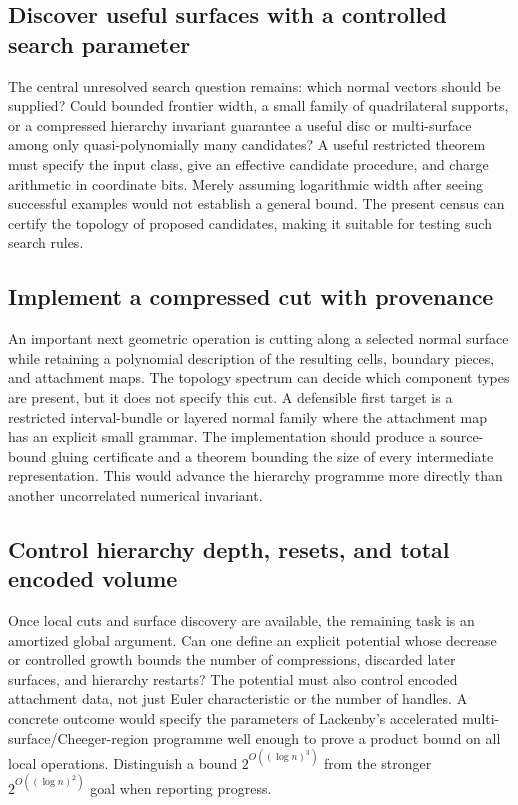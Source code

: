 \subsection{Discover useful surfaces with a controlled search parameter}

The central unresolved search question remains: which normal vectors should
be supplied? Could bounded frontier width, a small family of quadrilateral
supports, or a compressed hierarchy invariant guarantee a useful disc or
multi-surface among only quasi-polynomially many candidates? A useful
restricted theorem must specify the input class, give an effective
candidate procedure, and charge arithmetic in coordinate bits. Merely
assuming logarithmic width after seeing successful examples would not
establish a general bound. The present census can certify the topology
of proposed candidates, making it suitable for testing such search rules.

\subsection{Implement a compressed cut with provenance}

An important next geometric operation is cutting along a selected normal
surface while retaining a polynomial description of the resulting cells,
boundary pieces, and attachment maps. The topology spectrum can decide
which component types are present, but it does not specify this cut.
A defensible first target is a restricted interval-bundle or layered
normal family where the attachment map has an explicit small grammar.
The implementation should produce a source-bound gluing certificate and
a theorem bounding the size of every intermediate representation. This
would advance the hierarchy programme more directly than another
uncorrelated numerical invariant.

\subsection{Control hierarchy depth, resets, and total encoded volume}

Once local cuts and surface discovery are available, the remaining task
is an amortized global argument. Can one define an explicit potential
whose decrease or controlled growth bounds the number of compressions,
discarded later surfaces, and hierarchy restarts? The potential must also
control encoded attachment data, not just Euler characteristic or the
number of handles. A concrete outcome would specify the parameters of
Lackenby's accelerated multi-surface/Cheeger-region programme well enough
to prove a product bound on all local operations. Distinguish a bound
$2^{O((\log n)^3)}$ from the stronger
$2^{O((\log n)^2)}$ goal when reporting progress.

